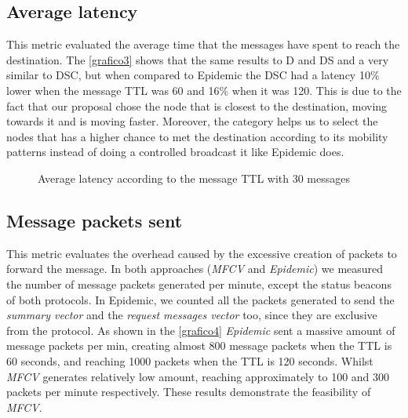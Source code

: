 \documentclass[letterpaper, 10 pt, conference]{ieeeconf}  %
\begin{document}
\subsection{Average latency}

This metric evaluated the average time that the messages have spent to reach the destination. The \autoref{grafico3} shows that the same results to D and DS and a very similar to DSC, but when compared to Epidemic the DSC had a latency 10\% lower when the message TTL was 60 and 16\% when it was 120. This is due to the fact that our proposal chose the node that is closest to the destination, moving towards it and is moving faster. Moreover, the category helps us to select the nodes that has a higher chance to met the destination according to its mobility patterns instead of doing a controlled broadcast it like Epidemic does.

\begin{figure}[thpb]
    \center
    \caption{Average latency according to the message TTL with 30 messages} \label{grafico3}
\end{figure}

\subsection{Message packets sent}

This metric evaluates the overhead caused by the excessive creation of packets to forward the message. In both approaches (\emph{MFCV} and \emph{Epidemic}) we measured the number of message packets generated per minute, except the status beacons of both protocols. In Epidemic, we counted all the packets generated to send the \emph{summary vector} and the \emph{request messages vector} too, since they are exclusive from the protocol. As shown in the \autoref{grafico4} \emph{Epidemic} sent a massive amount of message packets per min, creating almost 800 message packets when the TTL is 60 seconds, and reaching 1000 packets when the TTL is 120 seconds. Whilst \emph{MFCV} generates relatively low amount, reaching approximately to 100 and 300 packets per minute respectively. These results demonstrate the feasibility of \emph{MFCV}.
\end{document}
